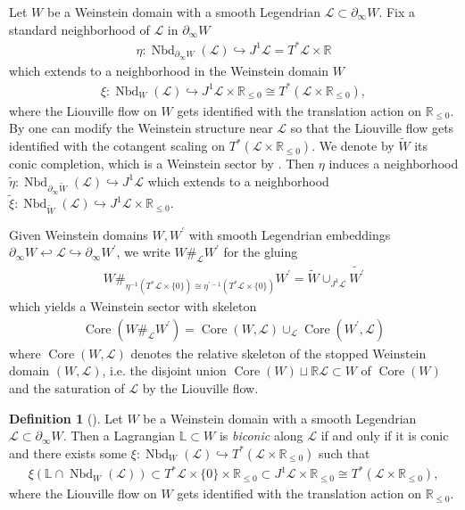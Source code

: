 \documentclass[a4paper,12pt, twoside, pdftex]{amsart}
\theoremstyle{definition}
\newtheorem{definition}[dummy]{Definition}
\numberwithin{equation}{section}
\newcommand{\Core}{\operatorname{Core}}
\newcommand{\del}{\partial}
\newcommand{\Nbd}{\operatorname{Nbd}}
\newcommand{\cL}{\mathcal{L}}
\newcommand{\bL}{\mathbb{L}}
\newcommand{\bR}{\mathbb{R}}
\begin{document}
Let
$W$
be a Weinstein domain with a smooth Legendrian
$\cL \subset \del_\infty W$.
Fix a standard neighborhood of
$\cL$
in
$\del_\infty W$
\begin{align*}
\eta
\colon
\Nbd_{\del_\infty W}(\cL)
\hookrightarrow
J^1 \cL
=
T^* \cL \times \bR
\end{align*}
which extends to a neighborhood in the Weinstein domain
$W$
\begin{align*}
\xi
\colon
\Nbd_W(\cL)
\hookrightarrow
J^1 \cL \times \bR_{\leq 0}
\cong
T^*(\cL \times \bR_{\leq 0}),
\end{align*}
where the Liouville flow on
$W$
gets identified with the translation action on
$\bR_{\leq 0}$.
By
\cite[Proposition 2.9]{Eli}
one can modify the Weinstein structure near
$\cL$
so that
the Liouville flow gets identified with the cotangent scaling on
$T^*(\cL \times \bR_{\leq 0})$.
We denote by
$\widetilde{W}$
its conic completion,
which is a Weinstein sector by
\cite[Lemma 2.13]{GPS1}.
Then
$\eta$
induces a neighborhood 
$\widetilde{\eta}
\colon
\Nbd_{\del_\infty \widetilde{W}}(\cL)
\hookrightarrow
J^1 \cL$
which extends to a neighborhood
$\widetilde{\xi}
\colon
\Nbd_{\widetilde{W}}(\cL)
\hookrightarrow
J^1 \cL \times \bR_{\leq 0}$.

Given Weinstein domains
$W, W^\prime$
with smooth Legendrian embeddings
$\del_\infty W \hookleftarrow \cL \hookrightarrow \del_\infty W^\prime$,
we write
$W \#_\cL W^\prime$
for the gluing
\begin{align*}
W \#_{\eta^{-1}(T^* \cL \times \{ 0 \}) \cong \eta^{\prime -1}(T^* \cL \times \{ 0 \})} W^\prime
=
\widetilde{W} \cup_{J^1 \cL} \widetilde{W^\prime}
\end{align*}
which yields a Weinstein sector with skeleton
\begin{align*}
\Core(W \#_\cL W^\prime)
=
\Core(W, \cL)
\cup_\cL
\Core(W^\prime, \cL)
\end{align*}
where
$\Core(W, \cL)$
denotes the relative skeleton of the stopped Weinstein domain
$(W, \cL)$,
i.e.
the disjoint union
$\Core(W) \sqcup \bR \cL \subset W$
of
$\Core(W)$
and the saturation of
$\cL$
by the Liouville flow.

\begin{definition}[{\cite[Definition 4.9, Lemma 4.10]{GS1}}]
Let
$W$
be a Weinstein domain with a smooth Legendrian
$\cL \subset \del_\infty W$.
Then a Lagrangian
$\bL \subset W$
is
\emph{biconic}
along
$\cL$
if and only if
it is conic
and
there exists some
$\xi
\colon
\Nbd_W(\cL)
\hookrightarrow
T^*(\cL \times \bR_{\leq 0})$
such that
\begin{align*}
\xi(\bL \cap \Nbd_W(\cL))
\subset
T^* \cL \times \{ 0 \} \times \bR_{\leq 0}
\subset
J^1 \cL \times \bR_{\leq 0}
\cong
T^*(\cL \times \bR_{\leq 0}),
\end{align*}
where the Liouville flow on
$W$
gets identified with the translation action on
$\bR_{\leq 0}$.
\end{definition}
\end{document}
